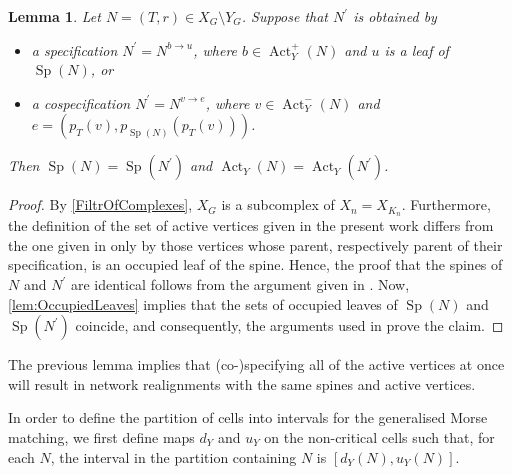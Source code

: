 \documentclass[reqno,dvipsnames]{amsart}
\theoremstyle{plain}
\newtheorem{lemma}[theorem]{Lemma}
\numberwithin{equation}{section}
\theoremstyle{definition}
\DeclareMathOperator{\Act}{Act}
\DeclareMathOperator{\Sp}{Sp}
\begin{document}
\begin{lemma} \label{lem:SpineEqualityIter}
	Let $N = (T,r)\in X_G\setminus Y_G$. Suppose that $N^\prime$ is obtained by
	\begin{itemize}
		\item a specification $N^\prime = N^{b\to u}$, where $b\in \Act_Y^+(N)$ and $u$ is a leaf of $\Sp(N)$, or
		\item a cospecification $N^\prime = N^{v\to e}$, where $v\in \Act_Y^-(N)$ and $e = (p_T(v), p_{\Sp(N)}(p_T(v)))$.
	\end{itemize}
	Then $\Sp(N) = \Sp(N^\prime)$ and $\Act_Y(N) = \Act_Y(N^\prime)$.
\end{lemma}

\begin{proof}
	By \autoref{FiltrOfComplexes}, $X_G$ is a subcomplex of $X_n=X_{K_n}$. Furthermore, the definition of the set of active vertices given in the present work differs from the one given in \cite{Kozlov25} only by those vertices whose parent, respectively parent of their specification, is an occupied leaf of the spine. Hence, the proof that the spines of $N$ and $N^\prime$ are identical follows from the argument given in \cite[Lemma 4.18]{Kozlov25}. Now, \autoref{lem:OccupiedLeaves} implies that the sets of occupied leaves of $\Sp(N)$ and $\Sp(N^\prime)$ coincide, and consequently, the arguments used in \cite[Lemma 4.18]{Kozlov25} prove the claim.
\end{proof} 

The previous lemma implies that (co-)specifying all of the active vertices at once will result in network realignments with the same spines and active vertices.

In order to define the partition of cells into intervals for the generalised Morse matching, we first define maps $d_Y$ and $u_Y$ on the non-critical cells such that, for each $N$, the interval in the partition containing $N$ is $[d_Y(N),u_Y(N)]$.
\end{document}
